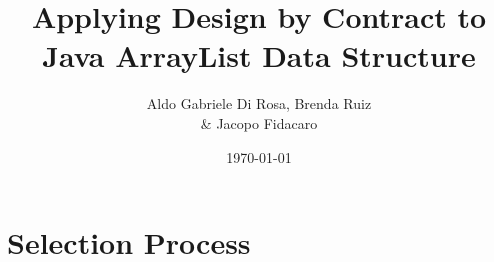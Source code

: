 \documentclass[a4paper]{article}
\title{Applying Design by Contract to \\ Java ArrayList Data Structure}
\author{Aldo Gabriele Di Rosa, Brenda Ruiz \\ \& Jacopo Fidacaro}
\date{\today}
\begin{document}
\maketitle

\section{Selection Process}
\end{document}
